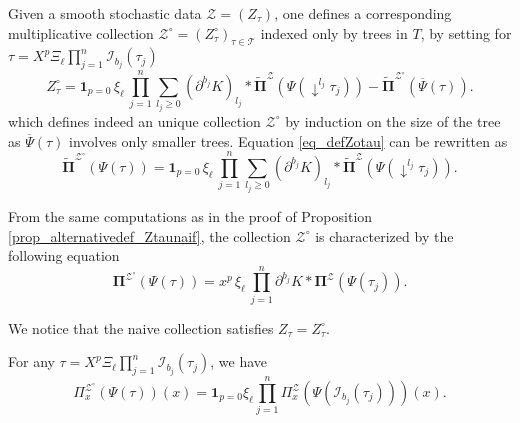 \documentclass[11pt]{preprint}
\newcommand{\mcI}{\mathcal{I}}
\newcommand{\mcZ}{\mathcal{Z}}
\newcommand{\mcT}{\mathcal{T}}
\def\PPi{\boldsymbol{\Pi}}
\begin{document}
Given a smooth stochastic data $\mcZ=(Z_\tau)$, one defines a corresponding multiplicative collection $\mcZ^\circ=(Z^\circ_\tau)_{\tau\in\mcT}$ indexed only by trees in $T$, by setting for $\tau = X^p\Xi_\ell\prod_{j=1}^n\mcI_{b_j}(\tau_j) $
\begin{equation} \label{eq_defZotau}
	 Z_{\tau}^\circ= \mathbf{1}_{p=0} \, \xi_\ell  \,  \prod_{j=1}^{n}\sum_{l_j\geq 0} (\partial^{b_j}K)_{l_j} * \widetilde{\PPi}^{\mcZ}\left(\Psi(\downarrow^{l_j}\tau_j)\right) - \widetilde{ \PPi}^{\mcZ^\circ}\left(\overline\Psi(\tau)\right). 
\end{equation}
which defines indeed an unique collection $\mcZ^\circ$ by induction on the size of the tree as $\overline\Psi(\tau)$ involves only smaller trees. Equation \ref{eq_defZotau} can be rewritten as
\begin{equation}\label{eq_mult_PPi_Zcirc}
	 \widetilde{ \PPi}^{\mcZ^\circ}\left(\Psi(\tau)\right)= \mathbf{1}_{p=0} \, \xi_\ell  \,  \prod_{j=1}^{n}\sum_{l_j\geq 0} (\partial^{b_j}K)_{l_j} * \widetilde{\PPi}^{\mcZ}\left(\Psi(\downarrow^{l_j}\tau_j)\right). 
\end{equation}

 From the same computations as in the proof of Proposition \ref{prop_alternativedef_Ztaunaif}, the collection $\mcZ^\circ$ is characterized by the following equation
\begin{equation}\label{eq_mult_PPi_Zcirc1}
	{ \PPi}^{\mcZ^\circ}\left(\Psi(\tau)\right) = x^p \, \xi_\ell  \,  \prod_{j=1}^{n} \partial^{b_j}K * {\PPi}^\mcZ\left(\Psi(\tau_j)\right).
\end{equation}


We notice that the naive collection satisfies $Z_\tau=Z^\circ_\tau$.


\begin{lemma}\label{lem_multiplicativity_modelPsicirc}
	For any $\tau = X^p\Xi_\ell\prod_{j=1}^n\mcI_{b_j}(\tau_j)$, we have
	$$
	\Pi^{\mcZ^\circ}_x( \Psi(\tau) )(x) =  \mathbf{1}_{p=0}\xi_\ell \prod_{j=1}^{n} {\Pi}_x^\mcZ \left( \Psi(\mcI_{b_j}(\tau_j))\right)(x).
	$$
\end{lemma}
\end{document}
